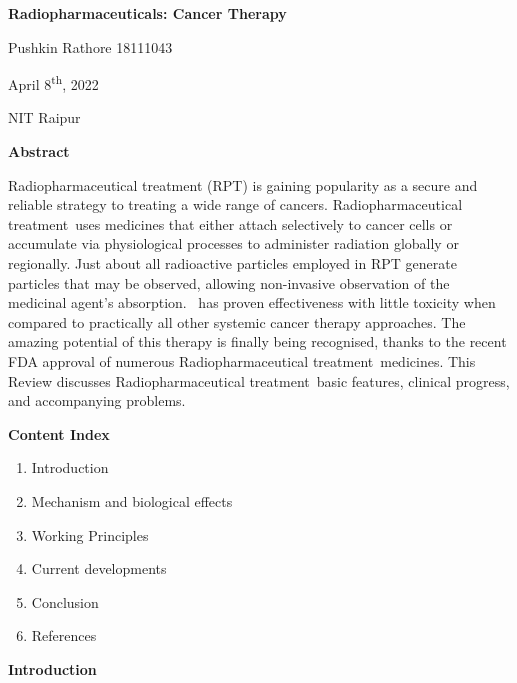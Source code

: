 \documentclass[
]{article}
\author{}
\date{}
\begin{document}
\textbf{Radiopharmaceuticals: Cancer Therapy}

Pushkin Rathore 18111043

April 8\textsuperscript{th}, 2022

NIT Raipur

\textbf{Abstract}

Radiopharmaceutical treatment (RPT) is gaining popularity as a secure
and reliable strategy to treating a wide range of cancers.
Radiopharmaceutical treatment~uses medicines that either attach
selectively to cancer cells or accumulate via physiological processes to
administer radiation globally or regionally. Just about all radioactive
particles employed in RPT generate particles that may be observed,
allowing non-invasive observation of the medicinal agent's absorption.
~has proven effectiveness with little toxicity when compared to
practically all other systemic cancer therapy approaches. The amazing
potential of this therapy is finally being recognised, thanks to the
recent FDA approval of numerous Radiopharmaceutical treatment~medicines.
This Review discusses Radiopharmaceutical treatment~basic features,
clinical progress, and accompanying problems.

\textbf{Content Index}

\begin{enumerate}
\def\labelenumi{\arabic{enumi}.}
\item
  Introduction
\item
  Mechanism and biological effects
\item
  Working Principles
\item
  Current developments
\item
  Conclusion
\item
  References
\end{enumerate}

\textbf{Introduction}
\end{document}
